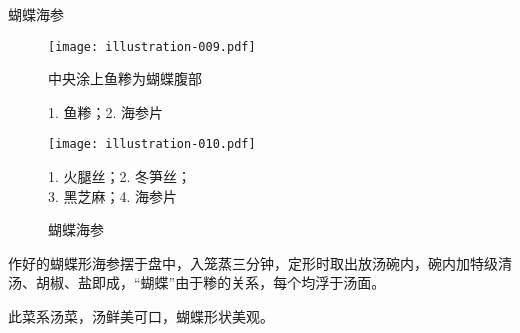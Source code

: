 \begin{recipe}{蝴蝶海参}
\begin{figure}[h]
\vspace{-.25\baselineskip}%
\parbox{14.75em}{%
        \vspace{-.1875\baselineskip}%
        \hspace{2em}\texttt{[image: illustration-009.pdf]}%
        \vspace{-.4375\baselineskip}%
        \caption{中央涂上鱼糁为蝴蝶腹部}
		\label{crushed fish is used to make the body of butterfly}
        \begingroup%
        \small%
        \noindent%
        \null\hspace{4em}1. 鱼糁；2. 海参片
        \endgroup%
}%
\begin{minipage}{10.75em}
        \texttt{[image: illustration-010.pdf]}%
        \caption{蝴蝶海参}
        \label{butterfly sea cucumber}
        \begingroup%
        \small%
        \noindent%
        \null\hspace{1.5em}1. 火腿丝；2. 冬笋丝；\\
        \null\hspace{1.5em}3. 黑芝麻；4. 海参片
        \endgroup%
\end{minipage}
\vspace{-.25\baselineskip}%
\end{figure}%
%

\step 作好的蝴蝶形海参摆于盘中，入笼蒸三分钟，定形时取出放汤碗内，碗内加特级清
汤、胡椒、盐即成，“蝴蝶”由于糁的关系，每个均浮于汤面。

\features

此菜系汤菜，汤鲜美可口，蝴蝶形状美观。

\end{recipe}


